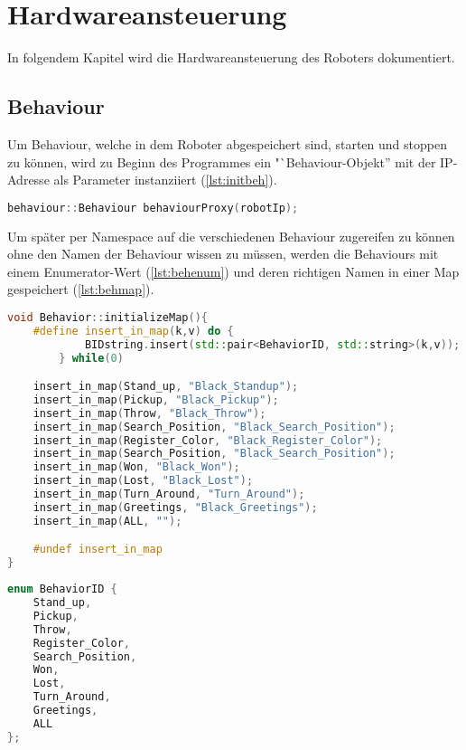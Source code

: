 \chapter{Hardwareansteuerung}

    In folgendem Kapitel wird die Hardwareansteuerung des Roboters dokumentiert.

    \section{Behaviour}

        Um Behaviour, welche in dem Roboter abgespeichert sind, starten und
        stoppen zu können, wird zu Beginn des Programmes ein
        "`Behaviour-Objekt'' mit der \ac{IP}-Adresse als Parameter instanziiert
        (\autoref{lst:initbeh}).

\begin{lstlisting}[language=c++,
                   caption={Initialisierung Behaviour},
                   label={lst:initbeh}]
behaviour::Behaviour behaviourProxy(robotIp);
\end{lstlisting}

        Um später per Namespace auf die verschiedenen Behaviour zugereifen zu
        können ohne den Namen der Behaviour wissen zu müssen, werden die
        Behaviours mit einem Enumerator-Wert (\autoref{lst:behenum}) und deren
        richtigen Namen in einer Map gespeichert (\autoref{lst:behmap}).

\begin{lstlisting}[language=c++,
                   caption={Behaviour Map},
                   label={lst:behmap}]
void Behavior::initializeMap(){
    #define insert_in_map(k,v) do {                                     \
            BIDstring.insert(std::pair<BehaviorID, std::string>(k,v));  \
        } while(0)

    insert_in_map(Stand_up, "Black_Standup");
    insert_in_map(Pickup, "Black_Pickup");
    insert_in_map(Throw, "Black_Throw");
    insert_in_map(Search_Position, "Black_Search_Position");
    insert_in_map(Register_Color, "Black_Register_Color");
    insert_in_map(Search_Position, "Black_Search_Position");
    insert_in_map(Won, "Black_Won");
    insert_in_map(Lost, "Black_Lost");
    insert_in_map(Turn_Around, "Turn_Around");
    insert_in_map(Greetings, "Black_Greetings");
    insert_in_map(ALL, "");

    #undef insert_in_map
}
\end{lstlisting}

\begin{lstlisting}[language=c++,
                   caption={Behaviour Enumerator},
                   label={lst:behenum}]
enum BehaviorID {
    Stand_up,
    Pickup,
    Throw,
    Register_Color,
    Search_Position,
    Won,
    Lost,
    Turn_Around,
    Greetings,
    ALL
};
\end{lstlisting}

